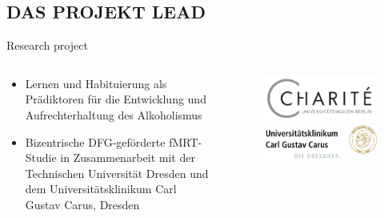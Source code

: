 \documentclass{bredelebeamer}
\begin{document}
\subsection{DAS PROJEKT LEAD}
\begin{frame}{Research project}
\begin{columns}
\begin{column}{6cm}
\begin{itemize}
\item Lernen und Habituierung als Prädiktoren für die Entwicklung und Aufrechterhaltung des Alkoholismus
\vspace{2mm}
\item Bizentrische DFG-geförderte fMRT-Studie in Zusammenarbeit mit der Technischen Universität Dresden und dem Universitätsklinikum Carl Gustav Carus, Dresden
\end{itemize}
\end{column}
\begin{column}{5cm}
\begin{figure}
    \includegraphics[scale=0.7]{images/Clogo.PNG}\\
    \vspace{2mm}
   \includegraphics[scale=0.7]{images/dres.jpg}
\end{figure}
\end{column}
\end{columns}
\end{frame}

\end{document}
